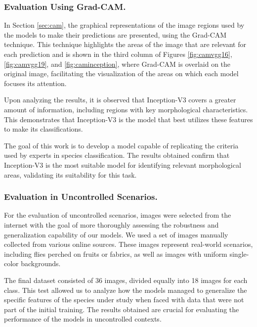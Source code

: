 \subsubsection{Evaluation Using Grad-CAM.}
In Section \ref{sec:cam}, the graphical representations of the image regions used by the models to make their predictions are presented, using the Grad-CAM technique. This technique highlights the areas of the image that are relevant for each prediction and is shown in the third column of Figures \ref{fig:camvgg16}, \ref{fig:camvgg19}, and \ref{fig:caminception}, where Grad-CAM is overlaid on the original image, facilitating the visualization of the areas on which each model focuses its attention.

Upon analyzing the results, it is observed that Inception-V3 covers a greater amount of information, including regions with key morphological characteristics. This demonstrates that Inception-V3 is the model that best utilizes these features to make its classifications.

The goal of this work is to develop a model capable of replicating the criteria used by experts in species classification. The results obtained confirm that Inception-V3 is the most suitable model for identifying relevant morphological areas, validating its suitability for this task.

\subsubsection{Evaluation in Uncontrolled Scenarios.}

For the evaluation of uncontrolled scenarios, images were selected from the internet with the goal of more thoroughly assessing the robustness and generalization capability of our models. We used a set of images manually collected from various online sources. These images represent real-world scenarios, including flies perched on fruits or fabrics, as well as images with uniform single-color backgrounds.

The final dataset consisted of 36 images, divided equally into 18 images for each class. This test allowed us to analyze how the models managed to generalize the specific features of the species under study when faced with data that were not part of the initial training. The results obtained are crucial for evaluating the performance of the models in uncontrolled contexts.

